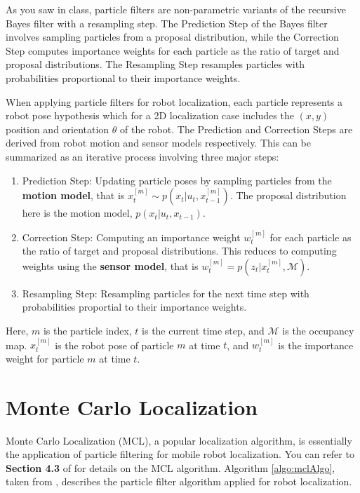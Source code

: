 \documentclass[12pt, a4paper]{article}
\begin{document}
As you saw in class, particle filters are non-parametric variants
of the recursive Bayes filter with a resampling step. The Prediction
Step of the Bayes filter involves sampling particles from a proposal
distribution, while the Correction Step computes importance weights
for each particle as the ratio of target and proposal distributions.
The Resampling Step resamples particles with probabilities proportional
to their importance weights.

When applying particle filters for robot localization, each particle
represents a robot pose hypothesis which for a 2D localization case
includes the $(x,y)$ position and orientation $\theta$ of the robot.
The Prediction and Correction Steps are derived from robot motion
and sensor models respectively. This can be summarized as an iterative
process involving three major steps:
\begin{enumerate}
	\item Prediction Step: Updating particle poses by sampling particles from
	      the \textbf{motion model}, that is $x^{[m]}_t\sim p(x_t|u_t,x^{[m]}_{t-1})$.
	      The proposal distribution here is the motion model, $p(x_t|u_t,x_{t-1})$.
	\item Correction Step: Computing an importance weight $w^{[m]}_t$ for each
	      particle as the ratio of target and proposal distributions. This reduces
	      to computing weights using the \textbf{sensor model}, that is $w^{[m]}_t = p(z_t|x^{[m]}_{t},\mathcal{M})$.
	\item Resampling Step: Resampling particles for the next time step with
	      probabilities proportial to their importance weights.
\end{enumerate}
Here, $m$ is the particle index, $t$ is the current time step, and
$\mathcal{M}$ is the occupancy map. $x^{[m]}_t$ is the robot pose of particle $m$ at time $t$,
and $w^{[m]}_t$ is the importance weight for particle $m$ at time $t$.


\section{Monte Carlo Localization}

Monte Carlo Localization (MCL), a popular localization algorithm,
is essentially the application of particle filtering for mobile robot
localization. You can refer to \textbf{Section 4.3 }of \cite{thrun2005probabilistic}
for details on the MCL algorithm. Algorithm \ref{algo:mclAlgo}, taken
from \cite{thrun2005probabilistic}, describes the particle filter
algorithm applied for robot localization.
\end{document}
